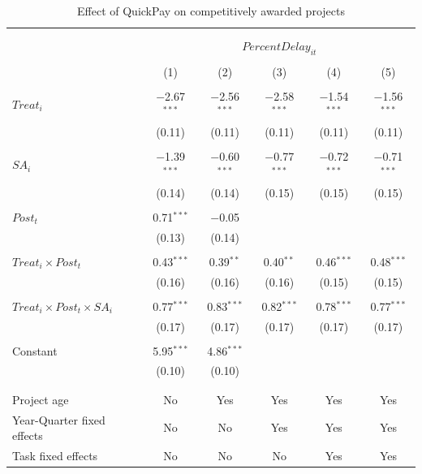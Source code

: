 \documentclass[
]{article}
\begin{document}
\begin{table}[H] \centering 
  \caption{Effect of QuickPay on competitively awarded projects} 
  \label{} 
\small 
\begin{tabular}{@{\extracolsep{-2pt}}lccccc} 
\\[-1.8ex]\hline 
\hline \\[-1.8ex] 
\\[-1.8ex] & \multicolumn{5}{c}{$PercentDelay_{it}$  } \\ 
\\[-1.8ex] & (1) & (2) & (3) & (4) & (5)\\ 
\hline \\[-1.8ex] 
 $Treat_i$ & $-$2.67$^{***}$ & $-$2.56$^{***}$ & $-$2.58$^{***}$ & $-$1.54$^{***}$ & $-$1.56$^{***}$ \\ 
  & (0.11) & (0.11) & (0.11) & (0.11) & (0.11) \\ 
  & & & & & \\ 
 $SA_i$ & $-$1.39$^{***}$ & $-$0.60$^{***}$ & $-$0.77$^{***}$ & $-$0.72$^{***}$ & $-$0.71$^{***}$ \\ 
  & (0.14) & (0.14) & (0.15) & (0.15) & (0.15) \\ 
  & & & & & \\ 
 $Post_t$ & 0.71$^{***}$ & $-$0.05 &  &  &  \\ 
  & (0.13) & (0.14) &  &  &  \\ 
  & & & & & \\ 
 $Treat_i \times Post_t$ & 0.43$^{***}$ & 0.39$^{**}$ & 0.40$^{**}$ & 0.46$^{***}$ & 0.48$^{***}$ \\ 
  & (0.16) & (0.16) & (0.16) & (0.15) & (0.15) \\ 
  & & & & & \\ 
 $Treat_i \times Post_t \times SA_i $ & 0.77$^{***}$ & 0.83$^{***}$ & 0.82$^{***}$ & 0.78$^{***}$ & 0.77$^{***}$ \\ 
  & (0.17) & (0.17) & (0.17) & (0.17) & (0.17) \\ 
  & & & & & \\ 
 Constant & 5.95$^{***}$ & 4.86$^{***}$ &  &  &  \\ 
  & (0.10) & (0.10) &  &  &  \\ 
  & & & & & \\ 
\hline \\[-1.8ex] 
Project age & No & Yes & Yes & Yes & Yes \\ 
Year-Quarter fixed effects & No & No & Yes & Yes & Yes \\ 
Task fixed effects & No & No & No & Yes & Yes \\ 

\end{tabular}
\end{table}
\end{document}
